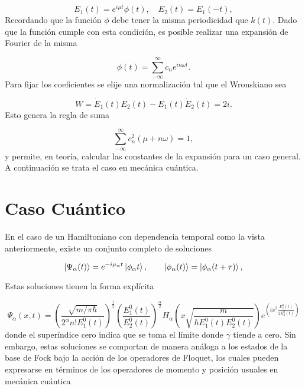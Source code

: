 \documentclass[a4paper,10pt]{report}
\begin{document}
\begin{equation}
E_1(t) = e^{i\mu t}\phi(t), \quad E_2(t)=E_1(-t),
\end{equation} Recordando que la función $\phi$ debe tener la misma periodicidad que $k(t)$. Dado que la función cumple con esta condición, es posible realizar una expansión de Fourier \cite{ArfkenMM} de la misma

\begin{equation}
\phi(t) = \sum_{-\infty}^\infty c_n e^{in\omega t}.
\end{equation} Para fijar los coeficientes se elije una normalización tal que el Wronskiano sea

\begin{equation}
W = \dot{E}_1(t)E_2(t)-E_1(t)\dot{E}_2(t) = 2i.
\end{equation}Esto genera la regla de suma

\begin{equation}
\sum_{-\infty}^\infty c_n^2(\mu + n\omega) = 1,
\end{equation} y permite, en teoría, calcular las constantes de la expansión para un caso general. A continuación se trata el caso en mecánica cuántica.

\section{Caso Cuántico}

En el caso de un Hamiltoniano con dependencia temporal como la vista anteriormente, existe un conjunto completo de soluciones \cite{BarnettSD}

\begin{equation}
\Ket{\Psi_\alpha (t)} = e^{-i\mu_\alpha t}\Ket{\phi_\alpha t}, \qquad \Ket{\phi_\alpha (t)}=\Ket{\phi_\alpha (t+\tau)},
\end{equation}

Estas soluciones tienen la forma explícita\cite{BrownPT}

\begin{equation}
\Psi_\alpha (x,t) = (\frac{\sqrt{m/\pi\hbar}}{2^\alpha n!E_1^0(t)})^{\frac{1}{2}}(\frac{E_1^0(t)}{E_2^0(t)})^\frac{\alpha}{2}H_\alpha(x\sqrt{\frac{m}{\hbar E_1^0(t) E_2^0(t)}})e^{(ix^2\frac{E_1^0(t)}{2E_2^0(t)})}
\end{equation} donde el superíndice cero indica que se toma el límite donde $\gamma$ tiende a cero. Sin embargo, estas soluciones se comportan de manera análoga a los estados de la base de Fock bajo la acción de los operadores de Floquet, los cuales pueden expresarse en términos de los operadores de momento y posición usuales en mecánica cuántica
\end{document}
